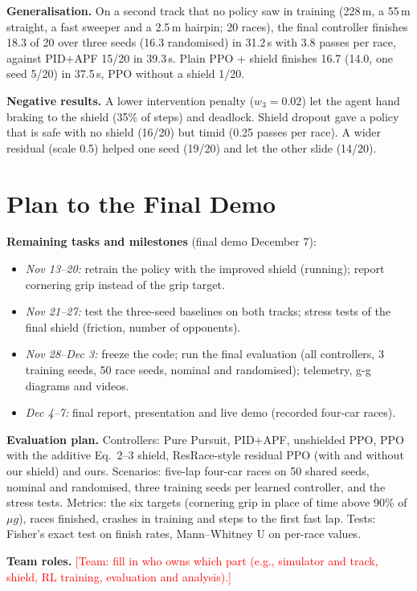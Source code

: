 \documentclass[conference]{IEEEtran}
\newcommand{\todo}[1]{\textcolor{red}{[#1]}}
\begin{document}
\textbf{Generalisation.} On a second track that no policy saw in training (228\,m, a 55\,m straight, a fast
sweeper and a 2.5\,m hairpin; 20 races), the final controller finishes 18.3 of 20 over three seeds (16.3 randomised) in
31.2\,s with 3.8 passes per race, against PID+APF 15/20 in 39.3\,s. Plain PPO + shield finishes 16.7 (14.0, one
seed 5/20) in 37.5\,s, PPO without a shield 1/20.

\textbf{Negative results.} A lower intervention penalty ($w_3 = 0.02$) let the agent hand braking to the
shield (35\% of steps) and deadlock. Shield dropout gave a policy that is safe with no shield (16/20) but timid
(0.25 passes per race). A wider residual (scale 0.5) helped one seed (19/20) and let the other slide (14/20).

\section{Plan to the Final Demo}
\textbf{Remaining tasks and milestones} (final demo December 7):
\begin{itemize}
\item \emph{Nov 13--20:} retrain the policy with the improved shield (running); report cornering grip instead of
the grip target.
\item \emph{Nov 21--27:} test the three-seed baselines on both tracks; stress tests of the final shield (friction,
number of opponents).
\item \emph{Nov 28--Dec 3:} freeze the code; run the final evaluation (all controllers, 3 training seeds, 50 race
seeds, nominal and randomised); telemetry, g-g diagrams and videos.
\item \emph{Dec 4--7:} final report, presentation and live demo (recorded four-car races).
\end{itemize}
\textbf{Evaluation plan.} Controllers: Pure Pursuit, PID+APF, unshielded PPO, PPO with the additive Eq.~2--3
shield, ResRace-style residual PPO (with and without our shield) and ours. Scenarios: five-lap four-car races on
50 shared seeds, nominal and randomised, three training seeds per learned controller, and the stress tests.
Metrics: the six targets (cornering grip in place of time above 90\% of $\mu g$), races finished, crashes in
training and steps to the first fast lap. Tests: Fisher's exact test on finish rates, Mann--Whitney U
on per-race values.

\textbf{Team roles.} \todo{Team: fill in who owns which part (e.g., simulator and track, shield, RL training,
evaluation and analysis).}
\end{document}
